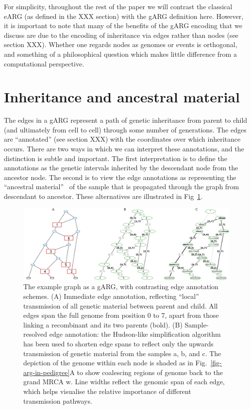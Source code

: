 \documentclass{article}
\begin{document}
For simplicity, throughout the rest of the paper we will contrast the
classical eARG (as defined in the XXX section) with the gARG definition
here. However, it is important to note that many of the benefits of the
gARG encoding that we discuss are due to the encoding of inheritance via
edges rather than nodes (see section XXX).
Whether one regards nodes as genomes or events is orthogonal,
and something of a philosophical question which makes little
difference from a computational perspective.

\section*{Inheritance and ancestral material}\label{Ancestry_resolution}
The edges in a gARG represent a path of genetic inheritance from
parent to child (and ultimately from cell to cell) through some
number of generations. The edges are ``annotated'' (see section XXX)
with the coordinates over which inheritance occurs. There are
two ways in which we can interpret these annotations, and the
distinction is subtle and important.
The first interpretation is to define the annotations as
the genetic intervals inherited by the descendant node from the
ancestor node. The second is to view the edge annotations as representing
the ``ancestral material''~\citep{wiuf1999ancestry,wiuf1999recombination}
of the sample that is propagated through
the graph from descendant to ancestor.
These alternatives are illustrated in Fig~\ref{fig-ancestry-resolution}.

\begin{figure}
\centering
\includegraphics[width=\textwidth]{illustrations/ancestry-resolution}
\caption{\label{fig-ancestry-resolution}
The \citet[][Fig.~1]{wiuf1999recombination} example graph as a gARG,
with contrasting
edge annotation schemes. (A) Immediate edge annotation, reflecting ``local''
transmission of all genetic material between parent and child. All edges span
the full genome from position 0 to 7, apart from those linking a recombinant
and its two parents (bold). (B) Sample-resolved edge annotation: the
Hudson-like simplification algorithm has been used to shorten edge spans to
reflect only the upwards transmission of genetic material from the samples
\textsf{a}, \textsf{b}, and \textsf{c}. The depiction of the genome within each
node is shaded as in Fig.~\ref{fig-arg-in-pedigree}A to show coalescing
regions of genome back to the grand MRCA \textsf{w}. Line widths reflect
the genomic span of each edge, which helps visualise the relative importance of
different transmission pathways.
}
\end{figure}
\end{document}
